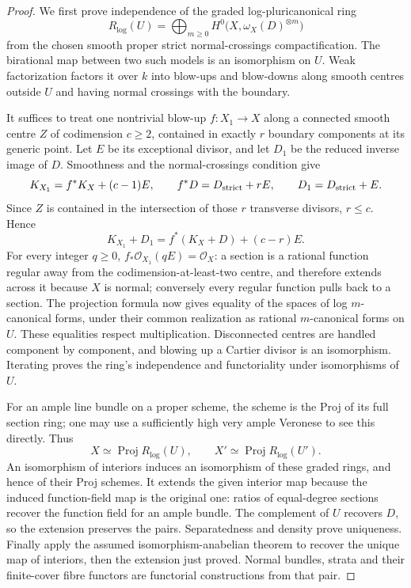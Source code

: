 \begin{proof}
We first prove independence of the graded log-pluricanonical ring
\[
 R_{\log}(U)=\bigoplus_{m\ge0}
      H^0\bigl(X,\omega_X(D)^{\otimes m}\bigr)
\]
from the chosen smooth proper strict normal-crossings compactification. The birational map between two such models is an isomorphism on $U$. Weak factorization \cite[Theorem 0.3.1, especially (6)]{AKMW2002A567} factors it over $k$ into blow-ups and blow-downs along smooth centres outside $U$ and having normal crossings with the boundary.

It suffices to treat one nontrivial blow-up $f:X_1\to X$ along a connected smooth centre $Z$ of codimension $c\ge2$, contained in exactly $r$ boundary components at its generic point. Let $E$ be its exceptional divisor, and let $D_1$ be the reduced inverse image of $D$. Smoothness and the normal-crossings condition give
\[
 K_{X_1}=f^*K_X+(c-1)E,\qquad
 f^*D=D_{\rm strict}+rE,\qquad
 D_1=D_{\rm strict}+E.
\]
Since $Z$ is contained in the intersection of those $r$ transverse divisors, $r\le c$. Hence
\[
 K_{X_1}+D_1=f^*(K_X+D)+(c-r)E .
\]
For every integer $q\ge0$, $f_*\mathcal O_{X_1}(qE)=\mathcal O_X$: a section is a rational function regular away from the codimension-at-least-two centre, and therefore extends across it because $X$ is normal; conversely every regular function pulls back to a section. The projection formula now gives equality of the spaces of log $m$-canonical forms, under their common realization as rational $m$-canonical forms on $U$. These equalities respect multiplication. Disconnected centres are handled component by component, and blowing up a Cartier divisor is an isomorphism. Iterating proves the ring's independence and functoriality under isomorphisms of $U$.

For an ample line bundle on a proper scheme, the scheme is the Proj of its full section ring; one may use a sufficiently high very ample Veronese to see this directly. Thus
\[
 X\simeq\operatorname{Proj}R_{\log}(U),\qquad
 X'\simeq\operatorname{Proj}R_{\log}(U').
\]
An isomorphism of interiors induces an isomorphism of these graded rings, and hence of their Proj schemes. It extends the given interior map because the induced function-field map is the original one: ratios of equal-degree sections recover the function field for an ample bundle. The complement of $U$ recovers $D$, so the extension preserves the pairs. Separatedness and density prove uniqueness. Finally apply the assumed isomorphism-anabelian theorem to recover the unique map of interiors, then the extension just proved. Normal bundles, strata and their finite-cover fibre functors are functorial constructions from that pair.
\end{proof}

